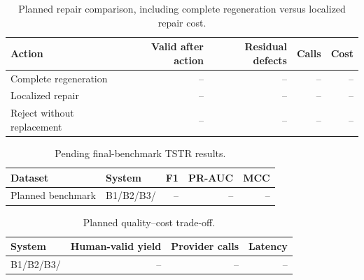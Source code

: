 \begin{table}[t]
  \centering
  \caption{Planned repair comparison, including complete regeneration versus
  localized repair cost.}
  \label{tab:future-repair}
  \begin{tabular}{@{}lrrrr@{}}
    \toprule
    Action & Valid after action & Residual defects & Calls & Cost \\
    \midrule
    Complete regeneration & -- & -- & -- & -- \\
    Localized repair & -- & -- & -- & -- \\
    Reject without replacement & -- & -- & -- & -- \\
    \bottomrule
  \end{tabular}
\end{table}

\begin{table}[t]
  \centering
  \caption{Pending final-benchmark TSTR results.}
  \label{tab:future-tstr}
  \begin{tabular}{@{}llrrr@{}}
    \toprule
    Dataset & System & F1 & PR-AUC & MCC \\
    \midrule
    Planned benchmark & B1/B2/B3/\rcqasyn{} & -- & -- & -- \\
    \bottomrule
  \end{tabular}
\end{table}

\begin{table}[t]
  \centering
  \caption{Planned quality--cost trade-off.}
  \label{tab:future-quality-cost}
  \begin{tabular}{@{}lrrr@{}}
    \toprule
    System & Human-valid yield & Provider calls & Latency \\
    \midrule
    B1/B2/B3/\rcqasyn{} & -- & -- & -- \\
    \bottomrule
  \end{tabular}
\end{table}

\begin{table}[t]
  \centering
  \caption{Planned coverage and diversity evaluation.}
  \label{tab:future-coverage}
\end{table}
